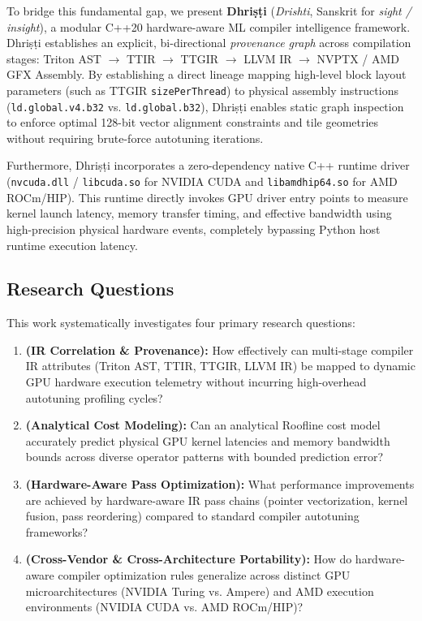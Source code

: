 \documentclass[10pt,journal,compsoc]{IEEEtran}
\begin{document}
To bridge this fundamental gap, we present \textbf{Dhri\d{s}\d{t}i} (\textit{Drishti}, Sanskrit for \textit{sight / insight}), a modular C++20 hardware-aware ML compiler intelligence framework. Dhri\d{s}\d{t}i establishes an explicit, bi-directional \textit{provenance graph} across compilation stages: Triton AST $\rightarrow$ TTIR $\rightarrow$ TTGIR $\rightarrow$ LLVM IR $\rightarrow$ NVPTX / AMD GFX Assembly. By establishing a direct lineage mapping high-level block layout parameters (such as TTGIR \texttt{sizePerThread}) to physical assembly instructions (\texttt{ld.global.v4.b32} vs. \texttt{ld.global.b32}), Dhri\d{s}\d{t}i enables static graph inspection to enforce optimal 128-bit vector alignment constraints and tile geometries without requiring brute-force autotuning iterations.

Furthermore, Dhri\d{s}\d{t}i incorporates a zero-dependency native C++ runtime driver (\texttt{nvcuda.dll} / \texttt{libcuda.so} for NVIDIA CUDA and \texttt{libamdhip64.so} for AMD ROCm/HIP). This runtime directly invokes GPU driver entry points to measure kernel launch latency, memory transfer timing, and effective bandwidth using high-precision physical hardware events, completely bypassing Python host runtime execution latency.

\subsection*{Research Questions}
This work systematically investigates four primary research questions:
\begin{enumerate}
    \item[\textbf{RQ1}] \textbf{(IR Correlation \& Provenance):} How effectively can multi-stage compiler IR attributes (Triton AST, TTIR, TTGIR, LLVM IR) be mapped to dynamic GPU hardware execution telemetry without incurring high-overhead autotuning profiling cycles?
    \item[\textbf{RQ2}] \textbf{(Analytical Cost Modeling):} Can an analytical Roofline cost model accurately predict physical GPU kernel latencies and memory bandwidth bounds across diverse operator patterns with bounded prediction error?
    \item[\textbf{RQ3}] \textbf{(Hardware-Aware Pass Optimization):} What performance improvements are achieved by hardware-aware IR pass chains (pointer vectorization, kernel fusion, pass reordering) compared to standard compiler autotuning frameworks?
    \item[\textbf{RQ4}] \textbf{(Cross-Vendor \& Cross-Architecture Portability):} How do hardware-aware compiler optimization rules generalize across distinct GPU microarchitectures (NVIDIA Turing vs. Ampere) and AMD execution environments (NVIDIA CUDA vs. AMD ROCm/HIP)?
\end{enumerate}
\end{document}
